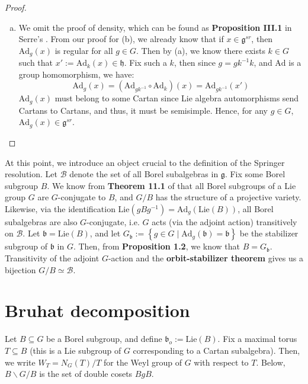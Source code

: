 \documentclass[11pt]{article}
\theoremstyle{definition}
\numberwithin{equation}{section} %
\begin{document}
\begin{proof}
\begin{enumerate}[(a)]
        \item We omit the proof of density, which can be found as \textbf{Proposition III.1} in Serre's \cite{Serre2001ComplexSemisimpleLieAlgebras}. From our proof for (b), we already know that if $x\in \mathfrak{g}^{sr}$, then $\mathrm{Ad}_g(x)$ is regular for all $g\in G$. Then by (a), we know there exists $k\in G$ such that $x':=\mathrm{Ad}_k(x) \in \mathfrak{h}$. Fix such a $k$, then since $g= gk^{-1}k$, and $\mathrm{Ad}$ is a group homomorphism, we have:
        $$
        \mathrm{Ad}_g(x) = \left(\mathrm{Ad}_{gk^{-1}}\circ \mathrm{Ad}_k\right) (x)  = \mathrm{Ad}_{gk^{-1}}(x')
        $$
        $\mathrm{Ad}_g(x)$ must belong to some Cartan since Lie algebra automorphisms send Cartans to Cartans, and thus, it must be semisimple. Hence, for any $g\in G$, $\mathrm{Ad}_g(x)\in \mathfrak{g}^{sr}$.
    \end{enumerate}
\end{proof}

\noindent At this point, we introduce an object crucial to the definition of the Springer resolution. Let $\mathcal{B}$ denote the set of all Borel subalgebras in $\mathfrak{g}$. Fix some Borel subgroup $B$. We know from \textbf{Theorem 11.1} of \cite{Borel1991LinearAlgebraicGroups} that all Borel subgroups of a Lie group $G$ are $G$-conjugate to $B$, and $G/B$ has the structure of a projective variety. Likewise, via the identification $\mathrm{Lie}\left(gBg^{-1}\right) = \mathrm{Ad}_g\left(\mathrm{Lie}(B)\right)$, all Borel subalgebras are also $G$-conjugate, i.e. $G$ acts (via the adjoint action) transitively on $\mathcal{B}$. Let $\mathfrak{b} = \mathrm{Lie}(B)$, and let $G_\mathfrak{b} := \left\{g\in G \mid \mathrm{Ad}_g( \mathfrak{b} )= \mathfrak{b}\right\}$ be the stabilizer subgroup of $\mathfrak{b}$ in $G$. Then, from \textbf{Proposition 1.2}, we know that $B = G_\mathfrak{b}$. Transitivity of the adjoint $G$-action and the \textbf{orbit-stabilizer theorem} gives us a bijection $G/B \simeq \mathcal{B}$.

\section{Bruhat decomposition}
Let $B\subseteq G$ be a Borel subgroup, and define $\mathfrak{b}_o := \mathrm{Lie}(B)$. Fix a maximal torus $T\subseteq B$ (this is a Lie subgroup of $G$ corresponding to a Cartan subalgebra). Then, we write $W_T = N_G(T)/T$ for the Weyl group of $G$ with respect to $T$. Below, $B\backslash G/B$ is the set of double cosets $BgB$.
\end{document}

